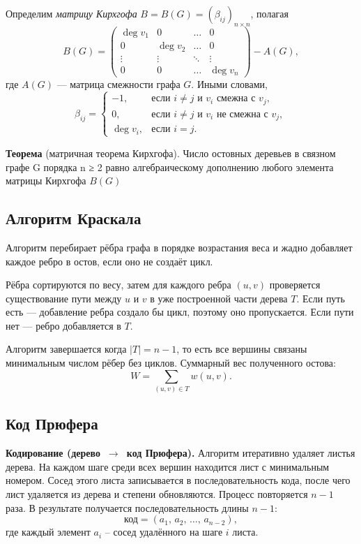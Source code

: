 Определим \textit{матрицу Кирхгофа} $B = B(G) = (\beta_{ij})_{n \times n}$, полагая
\[
    B(G) =
    \begin{pmatrix}
        \deg v_1 & 0        & \ldots & 0        \\
        0        & \deg v_2 & \ldots & 0        \\
        \vdots   & \vdots   & \ddots & \vdots   \\
        0        & 0        & \ldots & \deg v_n
    \end{pmatrix}
    - A(G),
\]
где $A(G)$ --- матрица смежности графа $G$. Иными словами,
\[
    \beta_{ij} =
    \begin{cases}
        -1,       & \text{если } i \neq j \text{ и } v_i \text{ смежна с } v_j, \\
        0,        & \text{если } i \neq j \text{ и } v_i \text{ не смежна с } v_j, \\
        \deg v_i, & \text{если } i = j.
    \end{cases}
\]

\textbf{Теорема} (матричная теорема Кирхгофа). Число остовных деревьев в связном
графе G порядка n ≥ 2 равно алгебраическому
дополнению любого элемента матрицы Кирхгофа $B(G)$

\subsection{Алгоритм Краскала}

Алгоритм перебирает рёбра графа в порядке возрастания веса и жадно
добавляет каждое ребро в остов, если оно не создаёт цикл.

Рёбра сортируются по весу, затем для каждого ребра $(u, v)$ проверяется
существование пути между $u$ и $v$ в уже построенной части дерева $T$.
Если путь есть — добавление ребра создало бы цикл, поэтому оно
пропускается. Если пути нет — ребро добавляется в $T$.

Алгоритм завершается когда $|T| = n - 1$, то есть все вершины
связаны минимальным числом рёбер без циклов.
Суммарный вес полученного остова:
\[
    W = \sum_{(u,v) \in T} w(u,v).
\]

\subsection{Код Прюфера}

\textbf{Кодирование (дерево~$\to$~код Прюфера).}
Алгоритм итеративно удаляет листья дерева.
На каждом шаге среди всех вершин находится лист
с минимальным номером.
Сосед этого листа записывается в последовательность кода,
после чего лист удаляется из дерева и степени обновляются.
Процесс повторяется $n-1$ раза.
В результате получается последовательность длины $n-1$:
\[
    \text{код} = (a_1,\, a_2,\, \ldots,\, a_{n-2}),
\]
где каждый элемент $a_i$ -- сосед удалённого на шаге $i$ листа.

